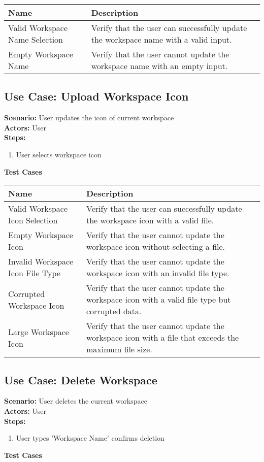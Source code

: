\documentclass{article}
\begin{document}
            \begin{longtable}{|p{}|p{}|}
            \hline
            \textbf{Name} & \textbf{Description} \\
            \hline
            Valid Workspace Name Selection & Verify that the user can successfully update the workspace name with a valid input. \\
\hline
Empty Workspace Name & Verify that the user cannot update the workspace name with an empty input. \\
\hline
\end{longtable}\subsection{\textbf{Use Case: Upload Workspace Icon}}
\textbf{Scenario:} User updates the icon of current workspace\\
\textbf{Actors:} User\\
\textbf{Steps:}
\begin{enumerate}
\item User selects workspace icon
\end{enumerate}
\textbf{Test Cases}

            \begin{longtable}{|p{}|p{}|}
            \hline
            \textbf{Name} & \textbf{Description} \\
            \hline
            Valid Workspace Icon Selection & Verify that the user can successfully update the workspace icon with a valid file. \\
\hline
Empty Workspace Icon & Verify that the user cannot update the workspace icon without selecting a file. \\
\hline
Invalid Workspace Icon File Type & Verify that the user cannot update the workspace icon with an invalid file type. \\
\hline
Corrupted Workspace Icon & Verify that the user cannot update the workspace icon with a valid file type but corrupted data. \\
\hline
Large Workspace Icon & Verify that the user cannot update the workspace icon with a file that exceeds the maximum file size. \\
\hline
\end{longtable}\subsection{\textbf{Use Case: Delete Workspace}}
\textbf{Scenario:} User deletes the current workspace\\
\textbf{Actors:} User\\
\textbf{Steps:}
\begin{enumerate}
\item User types 'Workspace Name' confirms deletion
\end{enumerate}
\textbf{Test Cases}
\end{document}
